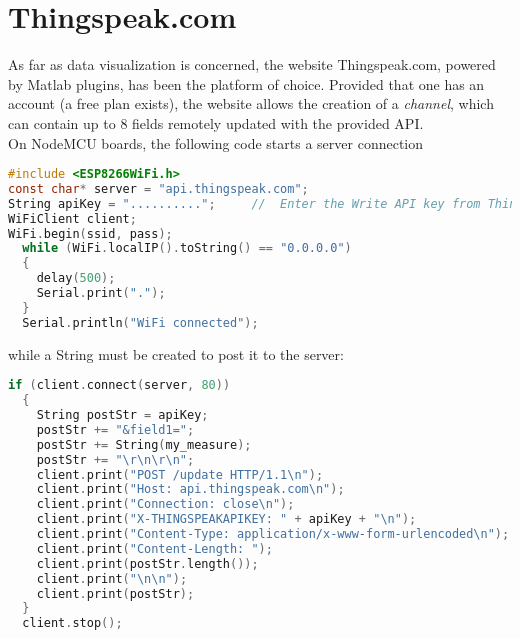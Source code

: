 \section{Thingspeak.com}
As far as data visualization is concerned, the website Thingspeak.com, powered by Matlab plugins, has been the platform of choice. Provided that one has an account (a free plan exists), the website allows the creation of a \textit{channel}, which can contain up to 8 fields remotely updated with the provided API. \\

On NodeMCU boards, the following code starts a server connection

\begin{lstlisting}[language=C]
#include <ESP8266WiFi.h>
const char* server = "api.thingspeak.com";
String apiKey = "..........";     //  Enter the Write API key from ThingSpeak
WiFiClient client;
WiFi.begin(ssid, pass);
  while (WiFi.localIP().toString() == "0.0.0.0") 
  {
    delay(500);
    Serial.print(".");
  }
  Serial.println("WiFi connected");
\end{lstlisting}

while a String must be created to post it to the server:

\begin{lstlisting}[language=C]
if (client.connect(server, 80)) 
  {
    String postStr = apiKey;
    postStr += "&field1=";
    postStr += String(my_measure);
    postStr += "\r\n\r\n";
    client.print("POST /update HTTP/1.1\n");
    client.print("Host: api.thingspeak.com\n");
    client.print("Connection: close\n");
    client.print("X-THINGSPEAKAPIKEY: " + apiKey + "\n");
    client.print("Content-Type: application/x-www-form-urlencoded\n");
    client.print("Content-Length: ");
    client.print(postStr.length());
    client.print("\n\n");
    client.print(postStr);
  }
  client.stop();
\end{lstlisting}

